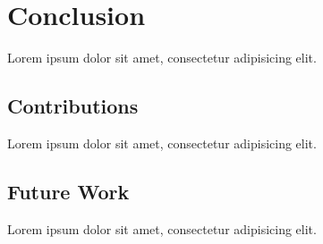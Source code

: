 \chapter{Conclusion} %
\label{cha:conclusion}

Lorem ipsum dolor sit amet, consectetur adipisicing elit.

\section{Contributions} %
\label{sec:conclusion:contributions}

Lorem ipsum dolor sit amet, consectetur adipisicing elit.


\section{Future Work} %
\label{sec:conclusion:future_work}

Lorem ipsum dolor sit amet, consectetur adipisicing elit.


